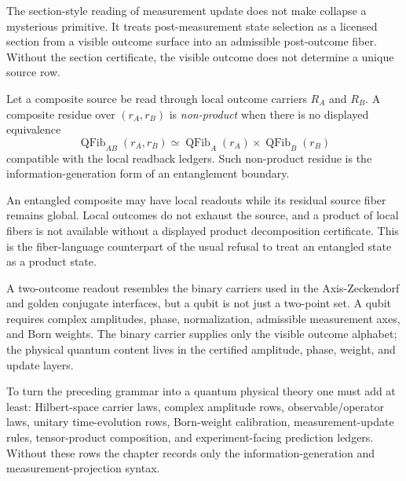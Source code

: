 \begin{principle}
\label{prin:quantum-state-update-certified-section}
The section-style reading of measurement update does not make collapse a
mysterious primitive. It treats post-measurement state selection as a
licensed section from a visible outcome surface into an admissible
post-outcome fiber. Without the section certificate, the visible outcome
does not determine a unique source row.
\end{principle}

\begin{definition}
\label{def:quantum-entanglement-nonproduct-residue}
Let a composite source be read through local outcome carriers $R_A$ and
$R_B$. A composite residue over $(r_A,r_B)$ is \emph{non-product} when
there is no displayed equivalence
$$
\operatorname{QFib}_{AB}(r_A,r_B)
\simeq
\operatorname{QFib}_{A}(r_A)\times\operatorname{QFib}_{B}(r_B)
$$
compatible with the local readback ledgers. Such non-product residue is
the information-generation form of an entanglement boundary.
\end{definition}

\begin{principle}
\label{prin:quantum-entanglement-global-source}
An entangled composite may have local readouts while its residual source
fiber remains global. Local outcomes do not exhaust the source, and a
product of local fibers is not available without a displayed product
decomposition certificate. This is the fiber-language counterpart of the
usual refusal to treat an entangled state as a product state.
\end{principle}

\begin{principle}
\label{prin:quantum-qubit-boundary}
A two-outcome readout resembles the binary carriers used in the
Axis-Zeckendorf and golden conjugate interfaces, but a qubit is not just
a two-point set. A qubit requires complex amplitudes, phase,
normalization, admissible measurement axes, and Born weights. The binary
carrier supplies only the visible outcome alphabet; the physical quantum
content lives in the certified amplitude, phase, weight, and update
layers.
\end{principle}

\begin{principle}
\label{prin:quantum-physical-closure-obligations}
To turn the preceding grammar into a quantum physical theory one must add
at least: Hilbert-space carrier laws, complex amplitude rows,
observable/operator laws, unitary time-evolution rows, Born-weight
calibration, measurement-update rules, tensor-product composition, and
experiment-facing prediction ledgers. Without these rows the chapter
records only the information-generation and measurement-projection
syntax.
\end{principle}

